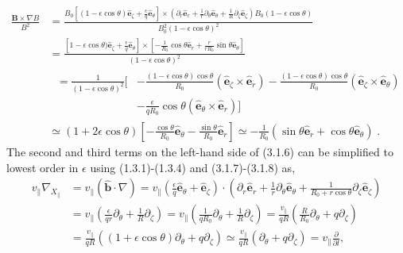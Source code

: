 \documentclass[12pt]{article}
\numberwithin{equation}{subsection}
\begin{document}
   \begin{equation}
   \begin{aligned}
      \frac{\bm{B}\times\nabla B}{B^2} &= \frac{B_0[(1-\epsilon\cos\theta)\bm{\hat{e}}_\zeta + \frac{\epsilon}{q}\bm{\hat{e}}_\theta]
      \times(\partial_r\bm{\hat{e}}_r + \frac{1}{r}\partial_\theta\bm{\hat{e}}_\theta + \frac{1}{R}\partial_\zeta\bm{\hat{e}}_\zeta)
      B_0(1-\epsilon\cos\theta)}{B_0^2(1-\epsilon\cos\theta)^2} \\ &=
      \frac{[1-\epsilon\cos\theta)\bm{\hat{e}}_\zeta + \frac{\epsilon}{q}\bm{\hat{e}}_\theta]
      \times[-\frac{1}{R_0}\cos\theta\bm{\hat{e}}_r + \frac{r}{r R_0}\sin\theta\bm{\hat{e}}_\theta]}{(1-\epsilon\cos\theta)^2} \\ &
      \begin{aligned}
         \;= \frac{1}{(1-\epsilon\cos\theta)^2}[&-\frac{(1-\epsilon\cos\theta)\cos\theta}{R_0}(\bm{\hat{e}}_\zeta\times\bm{\hat{e}}_r)
                                                 -\frac{(1-\epsilon\cos\theta)\cos\theta}{R_0}(\bm{\hat{e}}_\zeta\times\bm{\hat{e}}_\theta) \\
                                                &-\frac{\epsilon}{q R_0}\cos\theta(\bm{\hat{e}}_\theta\times\bm{\hat{e}}_r)]
      \end{aligned}         
      \\ &\simeq (1+2\epsilon\cos\theta)[-\frac{\cos\theta}{R_0}\bm{\hat{e}}_\theta-\frac{\sin\theta}{R_0}\bm{\hat{e}}_r]
          \simeq -\frac{1}{R_0}(\sin\theta\bm{\hat{e}}_r + \cos\theta\bm{\hat{e}}_\theta)\;.
   \end{aligned}
   \end{equation}
The second and third terms on the left-hand side of (3.1.6) can be simplified to lowest order in $\epsilon$ using (1.3.1)-(1.3.4) and
(3.1.7)-(3.1.8) as,
   \begin{equation}
   \begin{aligned}
         v_\parallel\nabla_{X_\parallel} &= 
         v_\parallel(\bm{\hat{b}}\cdot\nabla) = v_\parallel(\frac{\epsilon}{q}\bm{\hat{e}}_\theta +
         \bm{\hat{e}}_\zeta)\cdot(\partial_r\bm{\hat{e}}_r + \frac{1}{r}\partial_\theta\bm{\hat{e}}_\theta + \frac{1}{R_0 +
         r\cos\theta}\partial_\zeta\bm{\hat{e}}_\zeta) \\ &= 
         v_\parallel(\frac{\epsilon}{q r}\partial_\theta + \frac{1}{R}\partial_\zeta) = v_\parallel(\frac{1}{q R_0}\partial_\theta
         + \frac{1}{R}\partial_\zeta) = \frac{v_\parallel}{q R}(\frac{R}{R_0}\partial_\theta + q\partial_\zeta) \\ &=
         \frac{v_\parallel}{q R}((1+\epsilon\cos\theta)\partial_\theta + q\partial_\zeta)
         \simeq \frac{v_\parallel}{q R}(\partial_\theta + q\partial_\zeta) = v_\parallel\frac{\partial}{\partial l},
   \end{aligned}
   \end{equation}
\end{document}
